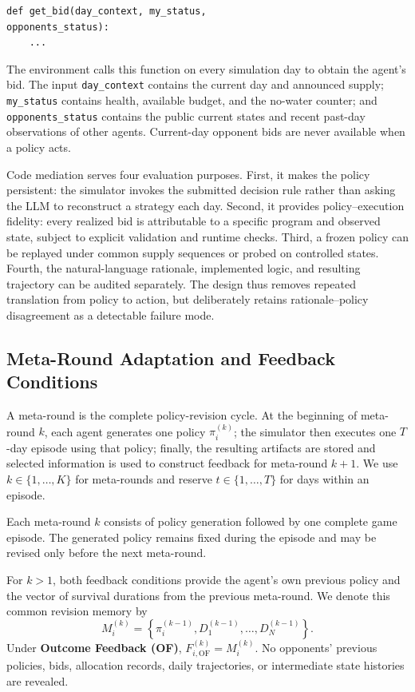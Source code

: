 \documentclass[letterpaper]{article} %
\begin{document}
\begin{verbatim}
def get_bid(day_context, my_status, 
opponents_status):
    ...
\end{verbatim}

The environment calls this function on every simulation day to obtain the
agent's bid. The input \texttt{day\_context} contains the current day and
announced supply; \texttt{my\_status} contains health, available budget, and
the no-water counter; and \texttt{opponents\_status} contains the public
current states and recent past-day observations of other agents. Current-day
opponent bids are never available when a policy acts.

Code mediation serves four evaluation purposes. First, it makes the policy
persistent: the simulator invokes the submitted decision rule rather than
asking the LLM to reconstruct a strategy each day. Second, it provides
policy--execution fidelity: every realized bid is attributable to a specific
program and observed state, subject to explicit validation and runtime checks.
Third, a frozen policy can be replayed under common supply sequences or probed
on controlled states. Fourth, the natural-language rationale, implemented
logic, and resulting trajectory can be audited separately. The design thus
removes repeated translation from policy to action, but deliberately retains
rationale--policy disagreement as a detectable failure mode.

\subsection{Meta-Round Adaptation and Feedback Conditions}
A meta-round is the complete policy-revision cycle. At the
beginning of meta-round $k$, each agent generates one policy
$\pi_i^{(k)}$; the simulator then executes one $T$-day episode
using that policy; finally, the resulting artifacts are stored
and selected information is used to construct feedback for
meta-round $k+1$. We use $k\in\{1,\ldots,K\}$ for meta-rounds
and reserve $t\in\{1,\ldots,T\}$ for days within an episode.

Each meta-round $k$ consists of policy generation followed by
one complete game episode. The generated policy remains fixed
during the episode and may be revised only before the next
meta-round.

For $k>1$, both feedback conditions provide the agent's own
previous policy and the vector of survival durations from the
previous meta-round. We denote this common revision memory by
\begin{equation}
    M_i^{(k)}
    =
    \left\{\pi_i^{(k-1)},
    D_1^{(k-1)},\ldots,D_N^{(k-1)}\right\}.
\end{equation}
Under \textbf{Outcome Feedback (OF)}, $F_{i,\mathrm{OF}}^{(k)}=M_i^{(k)}$.
No opponents' previous policies, bids, allocation records, daily
trajectories, or intermediate state histories are revealed.
\end{document}
